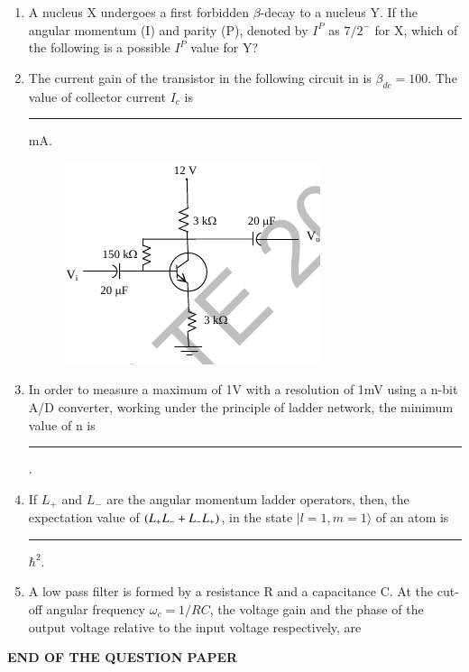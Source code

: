 \documentclass[journal,12pt,onecolumn]{IEEEtran}
\theoremstyle{remark}
\begin{document}
\begin{enumerate}
\item A nucleus X undergoes a first forbidden $\beta$-decay to a nucleus Y. If the angular momentum (I) and parity (P), denoted by $I^P$ as $7/2^-$ for X, which of the following is a possible $I^P$ value for Y?
\hfill{} \begin{enumerate}  \end{enumerate}

\item The current gain of the transistor in the following circuit in  is $\beta_{dc} = 100$. The value of collector current $I_c$ is \rule{3cm}{0.4pt} mA.
\hfill{}
\begin{figure}[H]
\centering
 \caption{} \label{62} \includegraphics{figs/q62.png}
\end{figure}
\item In order to measure a maximum of 1V with a resolution of 1mV using a n-bit A/D converter, working under the principle of ladder network, the minimum value of n is \rule{3cm}{0.4pt}.\hfill{}

\item If $L_+$ and $L_-$ are the angular momentum ladder operators, then, the expectation value of $\left(L_+L_- + L_-L_+\right)$, in the state $|l=1, m=1\rangle$ of an atom is \rule{3cm}{0.4pt} $\hbar^2$.\hfill{}

\item A low pass filter is formed by a resistance R and a capacitance C. At the cut-off angular frequency $\omega_c = 1/RC$, the voltage gain and the phase of the output voltage relative to the input voltage respectively, are
\hfill{} \begin{enumerate}  \end{enumerate}
\end{enumerate}

\hrulefill
\textbf{END OF THE QUESTION PAPER}
\hrulefill
\end{document}
